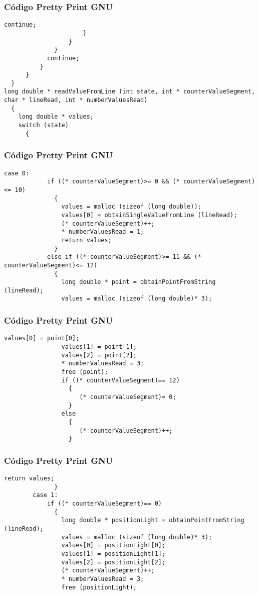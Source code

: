 \documentclass{beamer}
\begin{document}
\begin{frame}[fragile]
\frametitle{C\'odigo Pretty Print GNU}
\begin{lstlisting}[style=CStyle]
                        continue;
                      }
                  }
              }
            continue;
          }
      }
  }
long double * readValueFromLine (int state, int * counterValueSegment, char * lineRead, int * numberValuesRead)
  {
    long double * values;
    switch (state)
      {
        \end{lstlisting}
\end{frame}
\begin{frame}[fragile]
\frametitle{C\'odigo Pretty Print GNU}
\begin{lstlisting}[style=CStyle]
        case 0:
            if ((* counterValueSegment)>= 0 && (* counterValueSegment)<= 10)
              {
                values = malloc (sizeof (long double));
                values[0] = obtainSingleValueFromLine (lineRead);
                (* counterValueSegment)++;
                * numberValuesRead = 1;
                return values;
              }
            else if ((* counterValueSegment)>= 11 && (* counterValueSegment)<= 12)
              {
                long double * point = obtainPointFromString (lineRead);
                values = malloc (sizeof (long double)* 3);
\end{lstlisting}
\end{frame}
\begin{frame}[fragile]
\frametitle{C\'odigo Pretty Print GNU}
\begin{lstlisting}[style=CStyle]
                values[0] = point[0];
                values[1] = point[1];
                values[2] = point[2];
                * numberValuesRead = 3;
                free (point);
                if ((* counterValueSegment)== 12)
                  {
                     (* counterValueSegment)= 0;
                  }
                else
                  {
                     (* counterValueSegment)++;
                  }
\end{lstlisting}
\end{frame}
\begin{frame}[fragile]
\frametitle{C\'odigo Pretty Print GNU}
\begin{lstlisting}[style=CStyle]
                return values;
              }
        case 1:
            if ((* counterValueSegment)== 0)
              {
                long double * positionLight = obtainPointFromString (lineRead);
                values = malloc (sizeof (long double)* 3);
                values[0] = positionLight[0];
                values[1] = positionLight[1];
                values[2] = positionLight[2];
                (* counterValueSegment)++;
                * numberValuesRead = 3;
                free (positionLight);
\end{lstlisting}
\end{frame}
\end{document}
